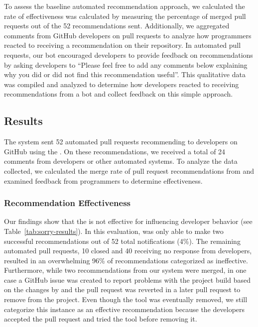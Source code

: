 To assess the baseline \tele automated recommendation approach, we calculated the rate of effectiveness was calculated by measuring the percentage of merged pull requests out of the 52 \toolone recommendations sent. Additionally, we aggregated comments from GitHub developers on pull requests to analyze how programmers reacted to receiving a \tele recommendation on their repository. In \toolone automated pull requests, our bot encouraged developers to provide feedback on recommendations by asking developers to ``Please feel free to add any comments below explaining why you did or did not find this recommendation useful''. This qualitative data was compiled and analyzed to determine how developers reacted to receiving \tele recommendations from a bot and collect feedback on this simple approach.

\subsection{Results}

The \toolone system sent 52 automated pull requests recommending \EP to developers on GitHub using the \tele. On these recommendations, we received a total of 24 comments from developers or other automated systems. To analyze the data collected, we calculated the merge rate of pull request recommendations from \toolone and examined feedback from programmers to determine effectiveness.



\subsubsection{Recommendation Effectiveness}

Our findings show that the \tele is not effective for influencing developer behavior (see Table~\ref{tab:sorry-results}). In this evaluation, \toolone was only able to make two successful recommendations out of 52 total notifications (4\%). The remaining automated pull requests, 10 closed and 40 receiving no response from developers, resulted in an overwhelming 96\% of \toolone recommendations categorized as ineffective. Furthermore, while two recommendations from our system were merged, in one case a GitHub issue was created to report problems with the project build based on the changes by \toolone and the pull request was reverted in a later pull request to remove \EP from the project. Even though the tool was eventually removed, we still categorize this instance as an effective recommendation because the developers accepted the pull request and tried the tool before removing it.

